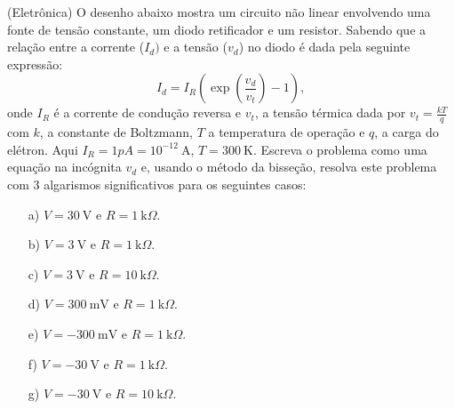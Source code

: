 \begin{ex}
\begin{exer}(Eletrônica)\label{prob_diodo} O desenho abaixo mostra um circuito não linear envolvendo uma fonte de tensão constante, um diodo retificador e um resistor. Sabendo que a relação entre a corrente ($I_d)$ e a tensão ($v_d$) no diodo é dada pela seguinte expressão:
  \begin{equation}
    I_d=I_R\left(\exp\left(\frac{v_d}{v_t}\right)-1\right),
  \end{equation}
onde $I_R$ é a corrente de condução reversa e $v_t$, a tensão térmica dada por $v_t=\frac{kT}{q}$ com $k$, a constante de Boltzmann, $T$ a temperatura de operação e $q$, a carga do elétron. Aqui  $I_R=1pA=10^{-12}~\mbox{A}$, $T=300~\mbox{K}$. Escreva o problema como uma equação na incógnita $v_d$ e, usando o método da bisseção, resolva este problema com 3 algarismos significativos para os seguintes casos:
\end{exer}
\begin{minipage}[l]{0.6\linewidth}
\begin{itemize}
\item[a)] $V=30~\mbox{V}$ e $R=1~\mbox{k}\Omega$.
\item[b)] $V=3~\mbox{V}$ e $R=1~\mbox{k}\Omega$.
\item[c)] $V=3~\mbox{V}$ e $R=10~\mbox{k}\Omega$.
\item[d)] $V=300~\mbox{mV}$ e $R=1~\mbox{k}\Omega$.
\item[e)] $V=-300~\mbox{mV}$ e $R=1~\mbox{k}\Omega$.
\item[f)] $V=-30~\mbox{V}$ e $R=1~\mbox{k}\Omega$.
\item[g)] $V=-30~\mbox{V}$ e $R=10~\mbox{k}\Omega$.
\end{itemize}\end{minipage}\begin{minipage}[c]{0.4\linewidth}

\end{minipage}
\end{ex}

